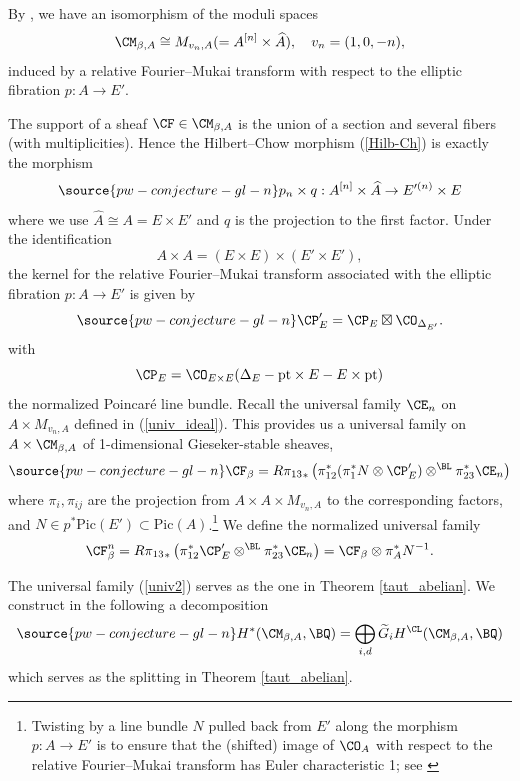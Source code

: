 By \cite[Theorem 3.15]{Yo}, we have an isomorphism of the moduli spaces
\[
\CM_{\beta,A} \cong M_{v_n, A}(= A^{[n]} \times \widehat{A}),\quad v_n = (1,0,-n),
\]
induced by a relative Fourier--Mukai transform with respect to the elliptic fibration $p: A \to E'$.

The support of a sheaf $\CF \in \CM_{\beta, A}$ is the union of a section and several fibers (with multiplicities). Hence the Hilbert--Chow morphism (\ref{Hilb-Ch}) is exactly the morphism
\begin{equation}\label{HC2}
\source{pw-conjecture-gl-n}
p_n\times q: A^{[n]} \times \widehat{A} \to E'^{(n)} \times E
\end{equation}
where we use $\widehat{A}\cong A = E \times E'$ and $q$ is the projection to the first factor.  Under the identification
\[
A \times A = (E \times E) \times (E'\times E'),
\]
the kernel for the relative Fourier--Mukai transform associated with the elliptic fibration $p: A \to E'$ is given by
\begin{equation}\label{rel_P}
\source{pw-conjecture-gl-n}
\CP'_E = \CP_E \boxtimes \CO_{\Delta_{E'}}.
\end{equation}
with
\[
\CP_E = \CO_{E\times E}(\Delta_E - \mathrm{pt}\times E - E\times \mathrm{pt})
\]
the normalized Poincar\'e line bundle. Recall the universal family $\CE_n$ on $A \times M_{v_n,A}$ defined in (\ref{univ_ideal}). This provides us a universal family on $A \times \CM_{\beta,A}$ of 1-dimensional Gieseker-stable sheaves,
\begin{equation}\label{univ2}
\source{pw-conjecture-gl-n}
\CF_\beta = {R\pi_{13}}_\ast \left( \pi_{12}^\ast (\pi_1^*N\otimes{\CP'_{E}}) \otimes^{\BL} \pi_{23}^\ast \CE_n \right)
\end{equation}
where $\pi_i, \pi_{ij}$ are the projection from $A \times A \times M_{v_n,A}$ to the corresponding factors, and $N \in p^* \mathrm{Pic}(E')\subset \mathrm{Pic}(A)$.\footnote{Twisting by a line bundle $N$ pulled back from $E'$ along the morphism $p: A \to {E'}$ is to ensure that the (shifted) image of $\CO_A$ with respect to the relative Fourier--Mukai transform has Euler characteristic 1; see \cite[Section 3.2]{Yo}} We define the normalized universal family
\[
\CF^{n}_\beta = {R\pi_{13}}_\ast \left( \pi_{12}^\ast {\CP'_{E}} \otimes^{\BL} \pi_{23}^\ast \CE_n \right) = \CF_\beta \otimes \pi_A^\ast N^{-1}.
\]

The universal family (\ref{univ2}) serves as the one in Theorem \ref{taut_abelian}. We construct in the following a decomposition
\begin{equation}\label{splitting1}
\source{pw-conjecture-gl-n}
H^\ast(\CM_{\beta, A}, \BQ) = \bigoplus_{i,d} \widetilde{G}_iH^\CL(\CM_{\beta, A}, \BQ)
\end{equation}
which serves as the splitting in Theorem \ref{taut_abelian}.

